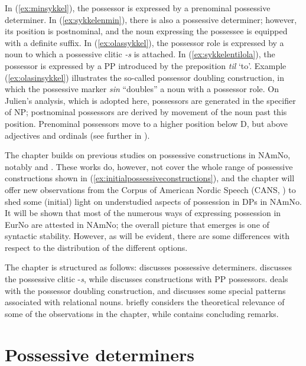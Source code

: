 \documentclass[output=paper,colorlinks,citecolor=brown]{langscibook}
\begin{document}
\noindent In (\ref{ex:minsykkel}), the possessor is expressed by a prenominal possessive determiner. In (\ref{ex:sykkelenmin}), there is also a possessive determiner; however, its position is postnominal, and the noun expressing the possessee is equipped with a definite suffix. In (\ref{ex:olassykkel}), the possessor role is expressed by a noun to which a possessive clitic \emph{-s} is attached. In (\ref{ex:sykkelentilola}), the possessor is expressed by a PP introduced by the preposition \emph{til} `to'. Example  (\ref{ex:olasinsykkel}) illustrates the so-called possessor doubling construction, in which the possessive marker \emph{sin} ``doubles'' a noun with a possessor role. On Julien's \citeyearpar{julien2005nominals} analysis, which is adopted here, possessors are generated in the specifier of NP; postnominal possessors are derived by movement of the noun past this position. Prenominal possessors move to a higher position below D, but above adjectives and ordinals (see further in ). 


The chapter builds on previous studies on possessive constructions in NAmNo, notably \citet{AnderssenWestergaard2012, WestergaardAnderssen2015, AnderssenEtAl2018} and \citet{Kinn2021}. These works do, however, not cover the whole range of possessive constructions shown in (\ref{ex:initialpossessiveconstructions}), and the chapter will offer new observations from the Corpus of American Nordic Speech (CANS, \citealt{Johannessen2015CANS}) to shed some (initial) light on understudied aspects of possession in DPs in NAmNo.  It will be shown that most of the numerous ways of expressing possession in EurNo are attested in NAmNo; the overall picture that emerges is one of syntactic stability.  However, as will be evident, there are some differences with respect to the distribution of the different options.

The chapter is structured as follows:  discusses possessive determiners.  discusses the possessive clitic -\emph{s}, while  discusses constructions with PP possessors.  deals with the possessor doubling construction, and  discusses some special patterns associated with relational nouns.  briefly considers the theoretical relevance of some of the observations in the chapter, while  contains concluding remarks. 


\section{Possessive determiners}\label{sec:prenom_postnom}
\largerpage[2]
\end{document}
